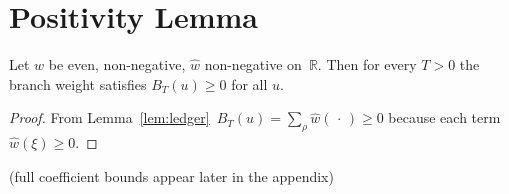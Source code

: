 \section{Positivity Lemma}\label{RH:positivity}

\begin{lemma}[Positivity]\label{lem:positivity}
Let $w$ be even, non-negative, $\widehat w$ non-negative on~$\mathbb R$.
Then for every $T>0$ the branch weight satisfies $B_T(u)\ge0$ for all $u$.
\end{lemma}

\begin{proof}
From Lemma~\ref{lem:ledger}
$\,B_T(u)=\!\sum_{\rho}\widehat w(\,\cdot\,)\ge0$ because each term
$\widehat w(\xi)\ge0$.
\end{proof}

(full coefficient bounds appear later in the appendix) 